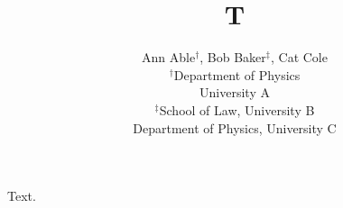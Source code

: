 \documentclass{article}
\title{T}
\author{Ann Able$^{\dagger}$, Bob Baker$^{\ddagger}$, Cat Cole \\ $^\dagger$Department of Physics \\ University A \\ $^\ddagger$School of Law, University B \\ Department of Physics, University C}
\begin{document}
\maketitle
Text.
\end{document}

